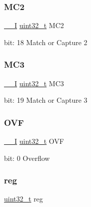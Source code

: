 \subsubsection{\texorpdfstring{MC2}{MC2}}
{\footnotesize\ttfamily \mbox{\hyperlink{core__cm0plus_8h_af63697ed9952cc71e1225efe205f6cd3}{\+\_\+\+\_\+I}} \mbox{\hyperlink{union_t_c_c___i_n_t_f_l_a_g___type_a7c2ec0f7b3f1314bdede58b182af397c}{uint32\+\_\+t}} M\+C2}

bit\+: 18 Match or Capture 2 \mbox{\label{union_t_c_c___i_n_t_f_l_a_g___type_a10c2fe286c42c7ea6786f99a3dcfded2}} 
\subsubsection{\texorpdfstring{MC3}{MC3}}
{\footnotesize\ttfamily \mbox{\hyperlink{core__cm0plus_8h_af63697ed9952cc71e1225efe205f6cd3}{\+\_\+\+\_\+I}} \mbox{\hyperlink{union_t_c_c___i_n_t_f_l_a_g___type_a7c2ec0f7b3f1314bdede58b182af397c}{uint32\+\_\+t}} M\+C3}

bit\+: 19 Match or Capture 3 \mbox{\label{union_t_c_c___i_n_t_f_l_a_g___type_a661ed6e1d21a6ca7e238db06b59ca3db}} 
\subsubsection{\texorpdfstring{OVF}{OVF}}
{\footnotesize\ttfamily \mbox{\hyperlink{core__cm0plus_8h_af63697ed9952cc71e1225efe205f6cd3}{\+\_\+\+\_\+I}} \mbox{\hyperlink{union_t_c_c___i_n_t_f_l_a_g___type_a7c2ec0f7b3f1314bdede58b182af397c}{uint32\+\_\+t}} O\+VF}

bit\+: 0 Overflow \mbox{\label{union_t_c_c___i_n_t_f_l_a_g___type_a6b91636401516a477989a336376d7b40}} 
\subsubsection{\texorpdfstring{reg}{reg}}
{\footnotesize\ttfamily \mbox{\hyperlink{union_t_c_c___i_n_t_f_l_a_g___type_a7c2ec0f7b3f1314bdede58b182af397c}{uint32\+\_\+t}} reg}

